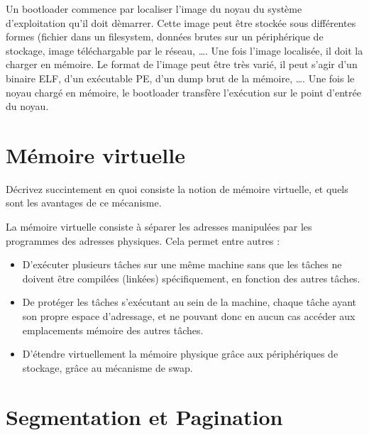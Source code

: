 \begin{correction}

Un bootloader commence par localiser l'image du noyau du syst\`eme
d'exploitation qu'il doit d\`emarrer. Cette image peut \^etre stock\'ee sous
diff\'erentes formes (fichier dans un filesystem, donn\'ees brutes sur un
p\'eriph\'erique de stockage, image t\'el\'echargable par le r\'eseau, \ldots.
Une fois l'image localis\'ee, il doit la charger en m\'emoire. Le format de
l'image peut \^etre tr\`es vari\'e, il peut s'agir d'un binaire ELF, d'un
ex\'ecutable PE, d'un dump brut de la m\'emoire, \ldots.
Une fois le noyau charg\'e en m\'emoire, le bootloader transf\`ere
l'ex\'ecution sur le point d'entr\'ee du noyau.

\end{correction}

%
%

\section{M\'emoire virtuelle
         }

D\'ecrivez succintement en quoi consiste la notion de m\'emoire virtuelle, et
quels sont les avantages de ce m\'ecanisme.

\begin{correction}

La m\'emoire virtuelle consiste \`a s\'eparer les adresses manipul\'ees par les
programmes des adresses physiques. Cela permet entre autres :
\begin{itemize}
\item D'ex\'ecuter plusieurs t\^aches sur une m\^eme machine sans que les
t\^aches ne doivent \^etre compil\'ees (link\'ees) sp\'ecifiquement, en
fonction des autres t\^aches.
\item De prot\'eger les t\^aches s'ex\'ecutant au sein de la machine, chaque
t\^ache ayant son propre espace d'adressage, et ne pouvant donc en aucun cas
acc\'eder aux emplacements m\'emoire des autres t\^aches.
\item D'\'etendre virtuellement la m\'emoire physique gr\^ace aux
p\'eriph\'eriques de stockage, gr\^ace au m\'ecanisme de swap.
\end{itemize}

\end{correction}

%
%

\section{Segmentation et Pagination
         }

